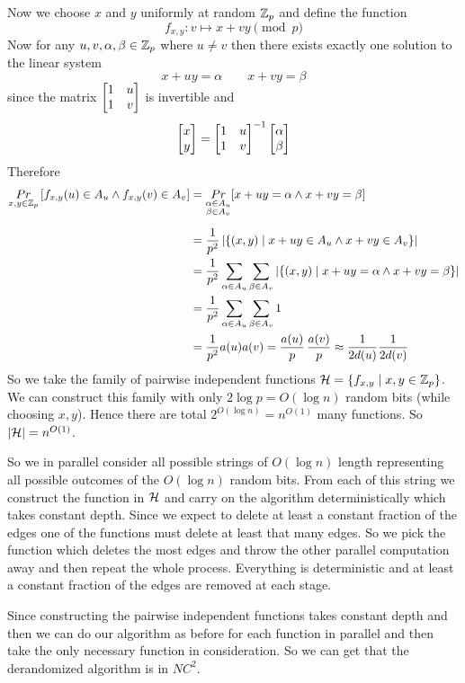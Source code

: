 \documentclass[a4paper, 11pt]{article}
\begin{document}
{Now we choose $x$ and $y$ uniformly at random $\mathbb{Z}_p$ and define the function $$f_{x,y}:v\mapsto x+vy\pmod{p}$$Now for any $u,v,\alpha,\beta\in \mathbb{Z}_p$ where $u\neq v$ then there exists exactly one solution to the linear system $$x+uy=\alpha \qquad x+vy=\beta$$ since the matrix $\left[\begin{matrix}1& u\\ 1& v\end{matrix}\right]$ is invertible and $$\left[\begin{matrix}x\\ y\end{matrix}\right] =\left[\begin{matrix}1&u\\ 1&v\end{matrix}\right]^{-1}\left[\begin{matrix}\alpha\\ \beta\end{matrix}\right]$$Therefore\begin{align*}
	\underset{x,y\in \mathbb{Z}_p}{Pr}\left[f_{x,y}(u)\in A_u\wedge f_{x,y}(v)\in A_v\right] & = \underset{\substack{\alpha\in A_u\\ \beta\in A_v}}{Pr}[x+uy=\alpha \wedge x+vy=\beta]\\[2mm]
	& = \frac1{p^2} \left| \{(x,y)\mid x+uy\in A_u\wedge x+vy\in A_v \} \right|\\
	& = \frac1{p^2} \sum_{\alpha\in A_u}\sum_{\beta\in A_v} |\{(x,y)\mid x+uy=\alpha \wedge x+vy=\beta\}|\\
	& = \frac1{p^2} \sum_{\alpha\in A_u}\sum_{\beta\in A_v}1\\
	& = \frac1{p^2}a(u)a(v)=\frac{a(u)}{p}\, \frac{a(v)}{p}\approx \frac1{2d(u)}\frac1{2d(v)}
\end{align*}
So we take the family of pairwise independent functions $\mathcal{H}=\{ f_{x,y}\mid x,y\in \mathbb{Z}_p\}$. We can construct this family with only $2\log p=O(\log n)$ random bits (while choosing $x,y$). Hence there are total $2^{O(\log n)}=n^{O(1)}$ many functions. So $|\mathcal{H}|=n^{O(1)}$. 

So we in parallel  consider all possible strings of $O(\log n)$ length representing all possible outcomes of the $O(\log n)$ random bits. From each of this string we construct the function in $\mathcal{H}$ and carry on the algorithm deterministically which takes constant depth. Since we expect to delete at least a constant fraction of the edges  one of the functions must delete at least that many edges. So we pick the function which deletes the most edges and throw the other parallel computation away and then repeat the whole process. Everything is deterministic and at least a constant fraction of the edges are removed at each stage. 

Since constructing the pairwise independent functions takes constant depth and then we can do our algorithm as before for each function in parallel and then take the only necessary function in consideration. So we can get that the derandomized algorithm is in $NC^2$.
}

	
	
\end{document}
